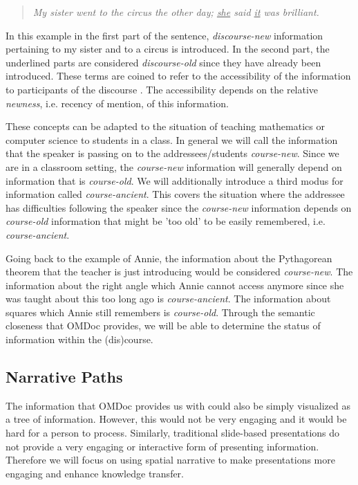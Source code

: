 \documentclass{llncs}
\begin{document}
\begin{quote}\em
  My sister went to the circus the other day; \underline{she} said \underline{it} was
  brilliant.
\end{quote}

In this example in the first part of the sentence, \textit{discourse-new} information pertaining to my sister and to a circus is introduced. In the second part, the underlined parts are considered \textit{discourse-old} since they have already been introduced. These terms are coined to refer to the accessibility of the information to participants of the discourse \cite{Newness:npentrel14}. The accessibility depends on the relative \textit{newness}, i.e. recency of mention, of this information.

These concepts can be adapted to the situation of teaching mathematics or computer science to students in a class. In general we will call the information that the speaker is passing on to the addressees/students \textit{course-new}. Since we are in a classroom setting, the \textit{course-new} information will generally depend on information that is \textit{course-old}. We will additionally introduce a third modus for information called \textit{course-ancient}. This covers the situation where the addressee has difficulties following the speaker since the \textit{course-new} information depends on \textit{course-old} information that might be 'too old' to be easily remembered, i.e. \textit{course-ancient}.

Going back to the example of Annie, the information about the Pythagorean theorem that the teacher is just introducing would be considered \textit{course-new}. The information about the right angle which Annie cannot access anymore since she was taught about this too long ago is \textit{course-ancient}. The information about squares which Annie still remembers is \textit{course-old}. Through the semantic closeness that OMDoc provides, we will be able to determine the status of information within the (dis)course.

\subsection{Narrative Paths}
\label{sec:narrativePaths}

The information that OMDoc provides us with could also be simply visualized as a tree of information. However, this would not be very engaging and it would be hard for a person to process. Similarly, traditional slide-based presentations do not provide a very engaging or interactive form of presenting information. Therefore we will focus on using spatial narrative to make presentations more engaging and enhance knowledge transfer. 
\end{document}
